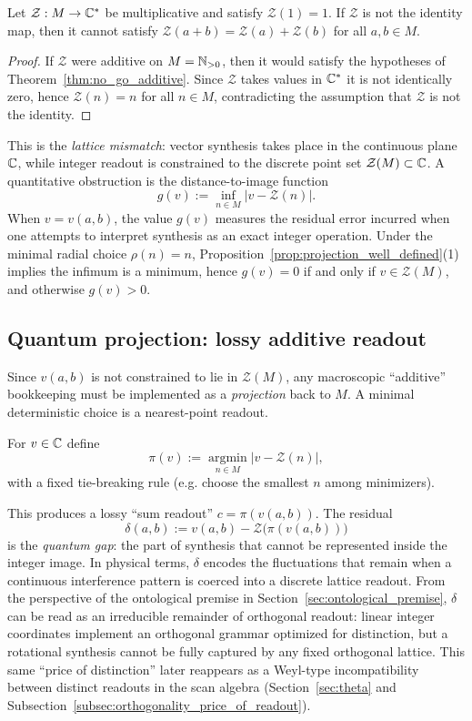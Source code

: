 \begin{corollary}
\label{cor:nonadditive}
Let $\mathcal{Z}:M\to\mathbb{C}^*$ be multiplicative and satisfy $\mathcal{Z}(1)=1$.
If $\mathcal{Z}$ is not the identity map, then it cannot satisfy $\mathcal{Z}(a+b)=\mathcal{Z}(a)+\mathcal{Z}(b)$ for all $a,b\in M$.
\end{corollary}

\begin{proof}
If $\mathcal{Z}$ were additive on $M=\mathbb{N}_{>0}$, then it would satisfy the hypotheses of Theorem~\ref{thm:no_go_additive}. Since $\mathcal{Z}$ takes values in $\mathbb{C}^*$ it is not identically zero, hence $\mathcal{Z}(n)=n$ for all $n\in M$, contradicting the assumption that $\mathcal{Z}$ is not the identity.
\end{proof}

This is the \emph{lattice mismatch}: vector synthesis takes place in the continuous plane $\mathbb{C}$, while integer readout is constrained to the discrete point set $\mathcal{Z}(M)\subset\mathbb{C}$. A quantitative obstruction is the distance-to-image function
$$
g(v):=\inf_{n\in M}\bigl|v-\mathcal{Z}(n)\bigr|.
$$
When $v=v(a,b)$, the value $g(v)$ measures the residual error incurred when one attempts to interpret synthesis as an exact integer operation. Under the minimal radial choice $\rho(n)=n$, Proposition~\ref{prop:projection_well_defined}(1) implies the infimum is a minimum, hence $g(v)=0$ if and only if $v\in\mathcal{Z}(M)$, and otherwise $g(v)>0$.

\subsection{Quantum projection: lossy additive readout}
Since $v(a,b)$ is not constrained to lie in $\mathcal{Z}(M)$, any macroscopic ``additive'' bookkeeping must be implemented as a \emph{projection} back to $M$. A minimal deterministic choice is a nearest-point readout.

\begin{definition}
\label{def:nearest_point}
For $v\in\mathbb{C}$ define
$$
\pi(v):=\operatorname*{argmin}_{n\in M}\bigl|v-\mathcal{Z}(n)\bigr|,
$$
with a fixed tie-breaking rule (e.g. choose the smallest $n$ among minimizers).
\end{definition}

This produces a lossy ``sum readout'' $c=\pi(v(a,b))$. The residual
$$
\delta(a,b):=v(a,b)-\mathcal{Z}\!\bigl(\pi(v(a,b))\bigr)
$$
is the \emph{quantum gap}: the part of synthesis that cannot be represented inside the integer image. In physical terms, $\delta$ encodes the fluctuations that remain when a continuous interference pattern is coerced into a discrete lattice readout.
From the perspective of the ontological premise in Section~\ref{sec:ontological_premise}, $\delta$ can be read as an irreducible remainder of orthogonal readout: linear integer coordinates implement an orthogonal grammar optimized for distinction, but a rotational synthesis cannot be fully captured by any fixed orthogonal lattice.
This same ``price of distinction'' later reappears as a Weyl-type incompatibility between distinct readouts in the scan algebra (Section~\ref{sec:theta} and Subsection~\ref{subsec:orthogonality_price_of_readout}).

